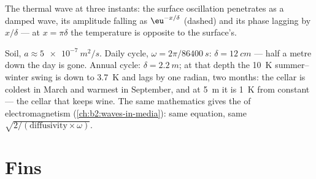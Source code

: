 \begin{omfigure}

{\small The thermal wave at three instants: the surface oscillation
penetrates as a damped wave, its amplitude falling as $\eu^{-x/\delta}$
(dashed) and its phase lagging by $x/\delta$ --- at $x = \pi\delta$ the
temperature is opposite to the surface's.}
\end{omfigure}

\begin{example}\label{ex:b2:heat-conduction:soil}
Soil, $a \approx \qty{5e-7}{m^2/s}$. Daily cycle, $\omega = 2\pi/\qty{86400}{s}$:
$\delta = \qty{12}{cm}$ --- half a metre down the day is gone. Annual cycle:
$\delta = \qty{2.2}{m}$; at that depth the \qty{10}{K} summer--winter swing is
down to \qty{3.7}{K} and lags by one radian, two months: the cellar is
coldest in March and warmest in September, and at \qty{5}{m} it is
\qty{1}{K} from constant --- the cellar that keeps wine. The same
mathematics gives the  of electromagnetism
(\cref{ch:b2:waves-in-media}): same equation, same $\sqrt{2/(\text{diffusivity}
\times\omega)}$.
\end{example}

\section{Fins}

